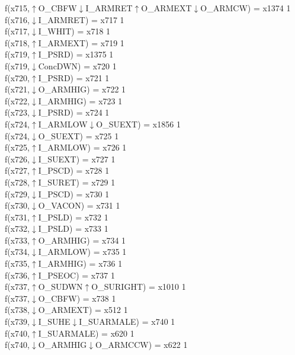 f(x715,$\uparrow$O\_CBFW$\downarrow$I\_ARMRET$\uparrow$O\_ARMEXT$\downarrow$O\_ARMCW) = x1374 {1} \\
f(x716,$\downarrow$I\_ARMRET) = x717 {1} \\
f(x717,$\downarrow$I\_WHIT) = x718 {1} \\
f(x718,$\uparrow$I\_ARMEXT) = x719 {1} \\
f(x719,$\uparrow$I\_PSRD) = x1375 {1} \\
f(x719,$\downarrow$ConcDWN) = x720 {1} \\
f(x720,$\uparrow$I\_PSRD) = x721 {1} \\
f(x721,$\downarrow$O\_ARMHIG) = x722 {1} \\
f(x722,$\downarrow$I\_ARMHIG) = x723 {1} \\
f(x723,$\downarrow$I\_PSRD) = x724 {1} \\
f(x724,$\uparrow$I\_ARMLOW$\downarrow$O\_SUEXT) = x1856 {1} \\
f(x724,$\downarrow$O\_SUEXT) = x725 {1} \\
f(x725,$\uparrow$I\_ARMLOW) = x726 {1} \\
f(x726,$\downarrow$I\_SUEXT) = x727 {1} \\
f(x727,$\uparrow$I\_PSCD) = x728 {1} \\
f(x728,$\uparrow$I\_SURET) = x729 {1} \\
f(x729,$\downarrow$I\_PSCD) = x730 {1} \\
f(x730,$\downarrow$O\_VACON) = x731 {1} \\
f(x731,$\uparrow$I\_PSLD) = x732 {1} \\
f(x732,$\downarrow$I\_PSLD) = x733 {1} \\
f(x733,$\uparrow$O\_ARMHIG) = x734 {1} \\
f(x734,$\downarrow$I\_ARMLOW) = x735 {1} \\
f(x735,$\uparrow$I\_ARMHIG) = x736 {1} \\
f(x736,$\uparrow$I\_PSEOC) = x737 {1} \\
f(x737,$\uparrow$O\_SUDWN$\uparrow$O\_SURIGHT) = x1010 {1} \\
f(x737,$\downarrow$O\_CBFW) = x738 {1} \\
f(x738,$\downarrow$O\_ARMEXT) = x512 {1} \\
f(x739,$\downarrow$I\_SUHE$\downarrow$I\_SUARMALE) = x740 {1} \\
f(x740,$\uparrow$I\_SUARMALE) = x620 {1} \\
f(x740,$\downarrow$O\_ARMHIG$\downarrow$O\_ARMCCW) = x622 {1} \\
